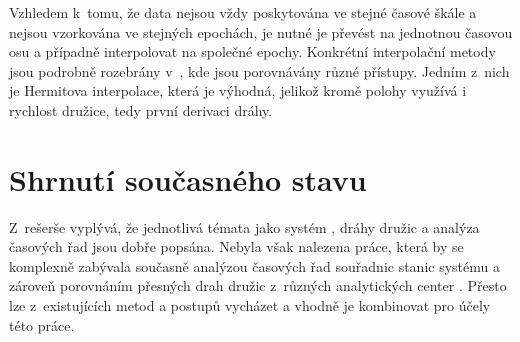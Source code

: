 Vzhledem k~tomu, že data nejsou vždy poskytována ve stejné časové škále a nejsou vzorkována ve stejných epochách, je nutné je převést na jednotnou časovou osu a případně interpolovat na společné epochy. Konkrétní interpolační metody jsou podrobně rozebrány v~\cite{zeitlhoefler_2024_interpolation}, kde jsou porovnávány různé přístupy. Jedním z~nich je Hermitova interpolace, která je výhodná, jelikož kromě polohy využívá i rychlost družice, tedy první derivaci dráhy.

\section{Shrnutí současného stavu}

Z~rešerše vyplývá, že jednotlivá témata jako systém , dráhy družic a analýza časových řad jsou dobře popsána. Nebyla však nalezena práce, která by se komplexně zabývala současně analýzou časových řad souřadnic stanic systému  a zároveň porovnáním přesných drah družic z~různých analytických center . Přesto lze z~existujících metod a postupů vycházet a vhodně je kombinovat pro účely této práce.